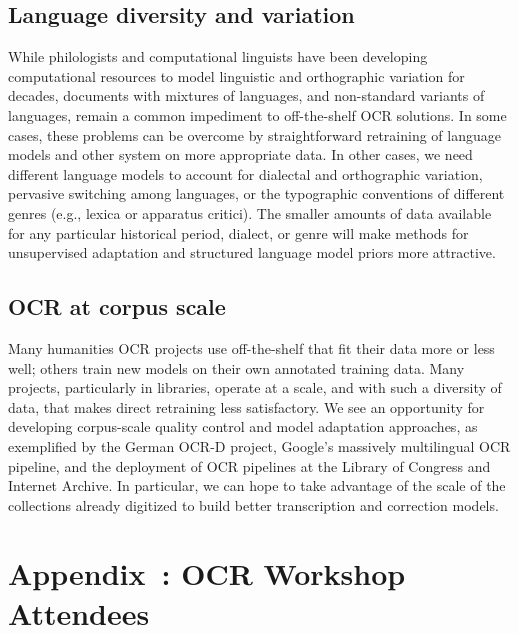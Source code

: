 \documentclass[twoside,11pt]{report}
\newcounter{appcounter}
\renewcommand{\theappcounter}{\Alph{appcounter}}
\renewcommand{\appendix}[2]{\refstepcounter{appcounter}%
  \label{app:#1}%
  \section{Appendix~\theappcounter: #2}%
  \label{sec:app-#1}}
\begin{document}
\subsection{Language diversity and variation}

While philologists and computational linguists have been developing computational resources to model linguistic and orthographic variation for decades, documents with mixtures of languages, and non-standard variants of languages, remain a common impediment to off-the-shelf OCR solutions. In some cases, these problems can be overcome by straightforward retraining of language models and other system on more appropriate data. In other cases, we need different language models to account for dialectal and orthographic variation, pervasive switching among languages, or the typographic conventions of different genres (e.g., lexica or apparatus critici). The smaller amounts of data available for any particular historical period, dialect, or genre will make methods for unsupervised adaptation and structured language model priors more attractive.

\subsection{OCR at corpus scale}

Many humanities OCR projects use off-the-shelf that fit their data more or less well; others train new models on their own annotated training data. Many projects, particularly in libraries, operate at a scale, and with such a diversity of data, that makes direct retraining less satisfactory. We see an opportunity for developing corpus-scale quality control and model adaptation approaches, as exemplified by the German OCR-D project, Google's massively multilingual OCR pipeline, and the deployment of OCR pipelines at the Library of Congress and Internet Archive. In particular, we can hope to take advantage of the scale of the collections already digitized to build better transcription and correction models.

\appendix{participants}{OCR Workshop Attendees}
\end{document}
